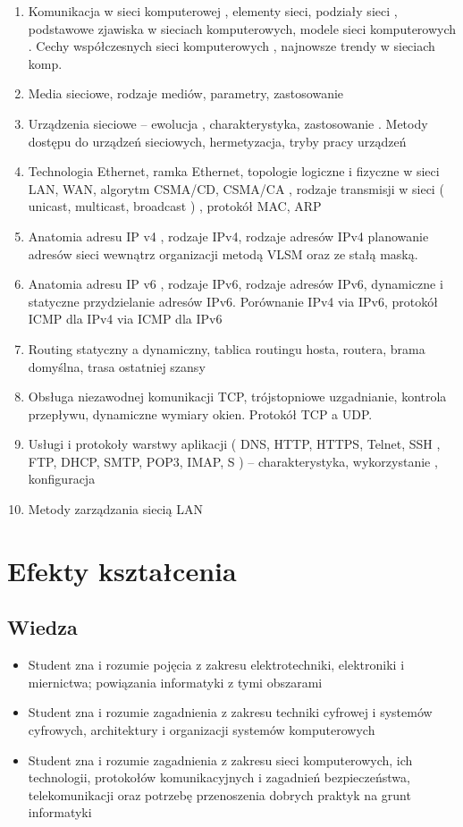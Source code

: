 \documentclass[12pt, a4paper]{article}
\begin{document}
\begin{enumerate}
  \item Komunikacja w sieci komputerowej , elementy sieci, podziały sieci , podstawowe zjawiska w sieciach komputerowych, modele sieci komputerowych . Cechy współczesnych sieci komputerowych , najnowsze trendy w sieciach komp.
  \item Media sieciowe, rodzaje mediów,  parametry, zastosowanie
  \item Urządzenia sieciowe – ewolucja , charakterystyka, zastosowanie . Metody dostępu do urządzeń sieciowych, hermetyzacja, tryby pracy urządzeń
  \item Technologia Ethernet, ramka Ethernet,  topologie logiczne i fizyczne w sieci LAN, WAN, algorytm CSMA/CD, CSMA/CA , rodzaje transmisji w sieci ( unicast, multicast, broadcast ) ,  protokół MAC, ARP
  \item Anatomia adresu IP v4 , rodzaje  IPv4, rodzaje adresów IPv4   planowanie adresów  sieci wewnątrz organizacji metodą VLSM oraz ze stałą maską.
  \item Anatomia adresu IP v6 , rodzaje  IPv6,  rodzaje adresów IPv6, dynamiczne i statyczne przydzielanie adresów IPv6. Porównanie IPv4 via IPv6, protokół ICMP dla IPv4 via ICMP dla IPv6
  \item Routing statyczny a dynamiczny, tablica routingu hosta, routera, brama domyślna, trasa ostatniej szansy
  \item Obsługa niezawodnej komunikacji TCP, trójstopniowe uzgadnianie, kontrola przepływu, dynamiczne wymiary okien. Protokół TCP a UDP.
  \item Usługi i protokoły warstwy aplikacji ( DNS, HTTP, HTTPS, Telnet, SSH , FTP, DHCP, SMTP, POP3, IMAP, S ) – charakterystyka, wykorzystanie , konfiguracja
  \item Metody zarządzania siecią LAN
\end{enumerate}

\section{Efekty kształcenia}

\subsection*{Wiedza}
\begin{itemize}
  \item Student zna i rozumie pojęcia  z zakresu elektrotechniki, elektroniki i miernictwa; powiązania informatyki z tymi obszarami
  \item Student zna i rozumie zagadnienia z zakresu techniki cyfrowej i systemów cyfrowych, architektury i organizacji systemów komputerowych
  \item Student zna i rozumie zagadnienia z zakresu sieci komputerowych, ich technologii, protokołów komunikacyjnych i zagadnień bezpieczeństwa, telekomunikacji oraz potrzebę przenoszenia dobrych praktyk na grunt informatyki
\end{itemize}
\end{document}
